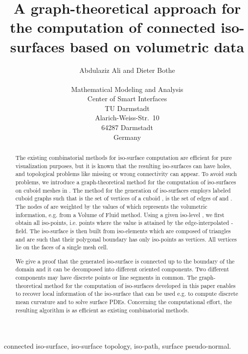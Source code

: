 \documentclass[a4paper,11pt]{article}
\begin{document}
\title{A graph-theoretical approach for the computation of connected iso-surfaces based on
volumetric data}
\author{Abdulaziz Ali and Dieter Bothe\\
\mbox{}\\
Mathematical Modeling and Analysis\\
Center of Smart Interfaces\\
TU Darmstadt\\
Alarich-Weiss-Str.\ 10\\
64287 Darmstadt\\
Germany}
\maketitle
\newpage
\tableofcontents
\newpage
\begin{abstract}
The existing combinatorial methods for iso-surface computation are efficient for pure visualization purposes,
but it is known that the resulting iso-surfaces can have holes, and topological problems like missing or wrong connectivity
can appear. To avoid such problems, we introduce a graph-theoretical method for the computation of iso-surfaces on cuboid
meshes in . The method for the generation of iso-surfaces employs labeled cuboid graphs
 such that  is the set of vertices of a cuboid ,  is the set of
edges of  and . The nodes of  are weighted by the values of 
which represents the volumetric information, e.g. from a Volume of Fluid method. Using a given iso-level
, we first obtain all iso-points, i.e. points where the value  is attained by the edge-interpolated
-field. The iso-surface is then built from iso-elements which are composed of triangles and are
such that their polygonal boundary has only iso-points as vertices. All vertices lie on the faces of a single mesh cell.

We give a proof that the generated iso-surface is connected up to the boundary of the domain and it can be
decomposed into different oriented components. Two different components may have discrete points or line segments
in common. The graph-theoretical method for the computation of iso-surfaces developed in this paper enables to
recover local information of the iso-surface that can be used e.g. to compute discrete mean curvature and to
solve surface PDEs. Concerning the computational effort, the resulting
algorithm is as efficient as existing combinatorial methods.
\end{abstract}
 connected iso-surface, iso-surface topology, iso-path, surface pseudo-normal.
\newpage
\end{document}

